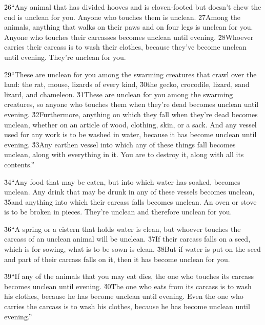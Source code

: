 \v{26}``Any animal that has divided hooves and is cloven-footed but doesn't chew the cud is unclean for you. Anyone who touches them is unclean. \v{27}Among the animals, anything that walks on their paws and on four legs is unclean for you. Anyone who touches their carcasses becomes unclean until evening. \v{28}Whoever carries their carcass is to wash their clothes, because they've become unclean until evening. They're unclean for you.

\v{29}``These are unclean for you among the swarming creatures that crawl over the land: the rat, mouse, lizards of every kind, \v{30}the gecko, crocodile, lizard, sand lizard, and chameleon. \v{31}These are unclean for you among the swarming creatures, so anyone who touches them when they're dead becomes unclean until evening. \v{32}Furthermore, anything on which they fall when they're dead becomes unclean, whether on an article of wood, clothing, skin, or a sack. And any vessel used for any work is to be washed in water, because it has become unclean until evening. \v{33}Any earthen vessel into which any of these things fall becomes unclean, along with everything in it. You are to destroy it, along with all its contents.''

\v{34}``Any food that may be eaten, but into which water has soaked, becomes unclean. Any drink that may be drunk in any of these vessels becomes unclean, \v{35}and anything into which their carcass falls becomes unclean. An oven or stove is to be broken in pieces. They're unclean and therefore unclean for you.

\v{36}``A spring or a cistern that holds water is clean, but whoever touches the carcass of an unclean animal will be unclean. \v{37}If their carcass falls on a seed, which is for sowing, what is to be sown is clean. \v{38}But if water is put on the seed and part of their carcass falls on it, then it has become unclean for you.

\v{39}``If any of the animals that you may eat dies, the one who touches its carcass becomes unclean until evening. \v{40}The one who eats from its carcass is to wash his clothes, because he has become unclean until evening. Even the one who carries the carcass is to wash his clothes, because he has become unclean until evening.''

